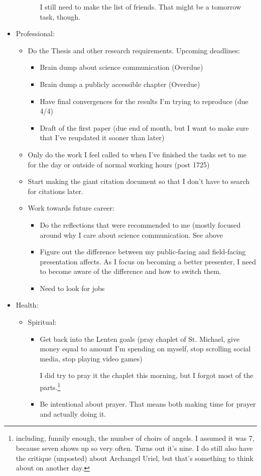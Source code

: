 \documentclass[12pt]{article}[titlepage]
\renewcommand{\,}{\textsuperscript{,}}
\begin{document}
\begin{itemize}
\begin{itemize}
\begin{itemize}
I still need to make the list of friends. That might be a tomorrow task, though.  
\end{itemize}
\end{itemize}  
\item Professional:   
\begin{itemize}   
\item Do the Thesis and other research requirements. Upcoming deadlines:  
\begin{itemize}  
\item Brain dump about science communication (Overdue)  
\item Brain dump a publicly accessible chapter (Overdue)  
\item Have final convergences for the results I'm trying to reproduce (due 4/4)  
\item Draft of the first paper (due end of month, but I want to make sure that I've reupdated it sooner than later)  
\end{itemize}  
\item Only do the work I feel called to when I've finished the tasks set to me for the day or outside of normal working hours (post 1725)  
\item Start making the giant citation document so that I don't have to search for citations later.  
\item Work towards future career:   
\begin{itemize}   
\item Do the reflections that were recommended to me (mostly focused around why I care about science communication. See above  
\item Figure out the difference between my public-facing and field-facing presentation affects. As I focus on becoming a better presenter, I need to become aware of the difference and how to switch them.  
\item Need to look for jobs  
\end{itemize}   
\end{itemize}   
\item Health:  
\begin{itemize}   
\item Spiritual:   
\begin{itemize}   
\item Get back into the Lenten goals (pray chaplet of St. Michael, give money equal to amount I'm spending on myself, stop scrolling social media, stop playing video games)

I did try to pray it the chaplet this morning, but I forgot most of the parts.\footnote{including, funnily enough, the number of choirs of angels. I assumed it was 7, because seven shows up so very often. Turns out it's nine. I do still also have the critique (unposted) about Archangel Uriel, but that's something to think about on another day.}  
\item Be intentional about prayer. That means both making time for prayer and actually doing it.


\end{itemize}
\end{itemize}
\end{itemize}
\end{document}
